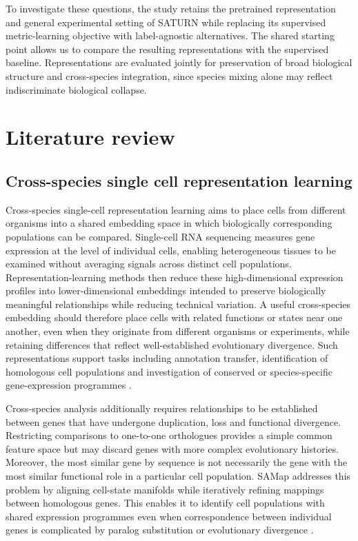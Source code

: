 \documentclass{article}
\begin{document}
To investigate these questions, the study retains the pretrained representation and general experimental setting of SATURN while replacing its supervised metric-learning objective with label-agnostic alternatives. The shared starting point allows us to compare the resulting representations with the supervised baseline. Representations are evaluated jointly for preservation of broad biological structure and cross-species integration, since species mixing alone may reflect indiscriminate biological collapse.

\section{Literature review}
\subsection{Cross-species single cell representation learning}
Cross-species single-cell representation learning aims to place cells from different organisms into a shared embedding space in which biologically corresponding populations can be compared. Single-cell RNA sequencing measures gene expression at the level of individual cells, enabling heterogeneous tissues to be examined without averaging signals across distinct cell populations. Representation-learning methods then reduce these high-dimensional expression profiles into lower-dimensional embeddings intended to preserve biologically meaningful relationships while reducing technical variation. A useful cross-species embedding should therefore place cells with related functions or states near one another, even when they originate from different organisms or experiments, while retaining differences that reflect well-established evolutionary divergence. Such representations support tasks including annotation transfer, identification of homologous cell populations and investigation of conserved or species-specific gene-expression programmes \cite{SAMap, SATURN}.

Cross-species analysis additionally requires relationships to be established between genes that have undergone duplication, loss and functional divergence. Restricting comparisons to one-to-one orthologues provides a simple common feature space but may discard genes with more complex evolutionary histories. Moreover, the most similar gene by sequence is not necessarily the gene with the most similar functional role in a particular cell population. SAMap addresses this problem by aligning cell-state manifolds while iteratively refining mappings between homologous genes. This enables it to identify cell populations with shared expression programmes even when correspondence between individual genes is complicated by paralog substitution or evolutionary divergence \cite{SAMap}.
\end{document}
